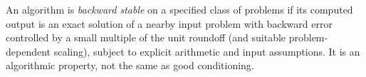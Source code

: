 
An algorithm is \emph{backward stable} on a specified class of problems if its computed output is an exact solution of a nearby input problem with backward error controlled by a small multiple of the unit roundoff (and suitable problem-dependent scaling), subject to explicit arithmetic and input assumptions. It is an algorithmic property, not the same as good conditioning.
